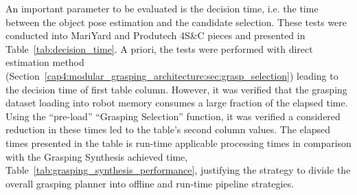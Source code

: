 \begin{table}[h!]
\end{table}

An important parameter to be evaluated is the decision time, i.e. the time between the object pose estimation and the candidate selection. These tests were conducted into MariYard and Produtech 4S\&C pieces and presented in Table~\ref{tab:decision_time}. A priori, the tests were performed with direct estimation method (Section~\ref{cap4:modular_grasping_architecture:sec:grasp_selection}) leading to the decision time of first table column. However, it was verified that the grasping dataset loading into robot memory consumes a large fraction of the elapsed time. Using the ``pre-load'' ``Grasping Selection'' function, it was verified a considered reduction in these times led to the table's second column values. The elapsed times presented in the table is run-time applicable processing times in comparison with the Grasping Synthesis achieved time, Table~\ref{tab:grasping_synthesis_performance}, justifying the strategy to divide the overall grasping planner into offline and run-time pipeline strategies.

